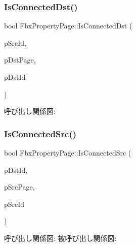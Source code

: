 \mbox{\label{class_fbx_property_page_ac637ff1244d34adf55fe0cc16eab4085}} 
\subsubsection{\texorpdfstring{Is\+Connected\+Dst()}{IsConnectedDst()}}
{\footnotesize\ttfamily bool Fbx\+Property\+Page\+::\+Is\+Connected\+Dst (\begin{DoxyParamCaption}\item[{\hyperlink{fbxtypes_8h_a088fa96de3b0b3ea69f0f6afef525dfb}{Fbx\+Int}}]{p\+Src\+Id,  }\item[{\hyperlink{class_fbx_property_page}{Fbx\+Property\+Page} $\ast$}]{p\+Dst\+Page,  }\item[{\hyperlink{fbxtypes_8h_a088fa96de3b0b3ea69f0f6afef525dfb}{Fbx\+Int}}]{p\+Dst\+Id }\end{DoxyParamCaption})}

呼び出し関係図\+:
\mbox{\label{class_fbx_property_page_a4760ecbd7175b14dfcd21c1e379b2d2c}} 
\subsubsection{\texorpdfstring{Is\+Connected\+Src()}{IsConnectedSrc()}}
{\footnotesize\ttfamily bool Fbx\+Property\+Page\+::\+Is\+Connected\+Src (\begin{DoxyParamCaption}\item[{\hyperlink{fbxtypes_8h_a088fa96de3b0b3ea69f0f6afef525dfb}{Fbx\+Int}}]{p\+Dst\+Id,  }\item[{\hyperlink{class_fbx_property_page}{Fbx\+Property\+Page} $\ast$}]{p\+Src\+Page,  }\item[{\hyperlink{fbxtypes_8h_a088fa96de3b0b3ea69f0f6afef525dfb}{Fbx\+Int}}]{p\+Src\+Id }\end{DoxyParamCaption})}

呼び出し関係図\+:
被呼び出し関係図\+:
\mbox{\label{class_fbx_property_page_aa56d7641c8141df83d1ada2e3971068f}} 
